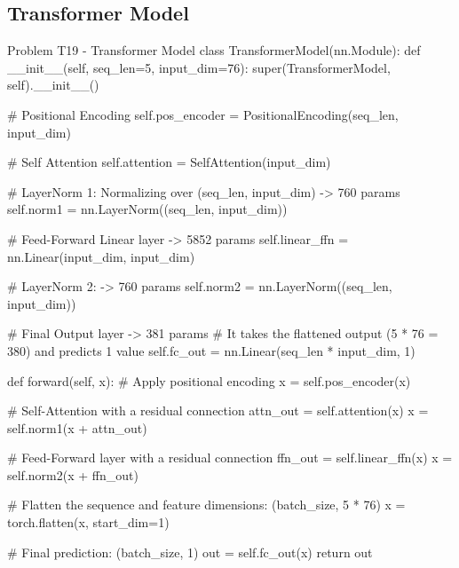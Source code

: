 \documentclass[12pt, a4paper]{article}
\begin{document}
            \subsection{Transformer Model}
                \begin{codeblock}{Problem T19 - Transformer Model}
                    class TransformerModel(nn.Module):
                        def __init__(self, seq_len=5, input_dim=76):
                            super(TransformerModel, self).__init__()
                            
                            # Positional Encoding
                            self.pos_encoder = PositionalEncoding(seq_len, input_dim)
                            
                            # Self Attention
                            self.attention = SelfAttention(input_dim)
                            
                            # LayerNorm 1: Normalizing over (seq_len, input_dim) -> 760 params
                            self.norm1 = nn.LayerNorm((seq_len, input_dim))
                            
                            # Feed-Forward Linear layer -> 5852 params
                            self.linear_ffn = nn.Linear(input_dim, input_dim)
                            
                            # LayerNorm 2: -> 760 params
                            self.norm2 = nn.LayerNorm((seq_len, input_dim))
                            
                            # Final Output layer -> 381 params
                            # It takes the flattened output (5 * 76 = 380) and predicts 1 value
                            self.fc_out = nn.Linear(seq_len * input_dim, 1)

                        def forward(self, x):
                            # Apply positional encoding
                            x = self.pos_encoder(x)
                            
                            # Self-Attention with a residual connection
                            attn_out = self.attention(x)
                            x = self.norm1(x + attn_out) 
                            
                            # Feed-Forward layer with a residual connection
                            ffn_out = self.linear_ffn(x)
                            x = self.norm2(x + ffn_out)
                            
                            # Flatten the sequence and feature dimensions: (batch_size, 5 * 76)
                            x = torch.flatten(x, start_dim=1)
                            
                            # Final prediction: (batch_size, 1)
                            out = self.fc_out(x)
                            return out
                \end{codeblock}
\end{document}
